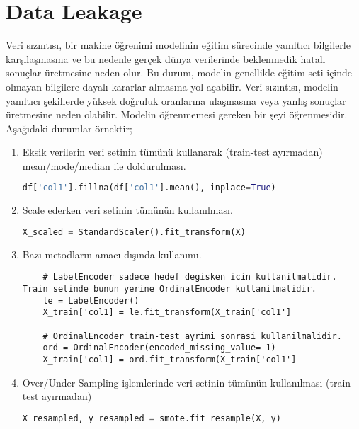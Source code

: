 \section{Data Leakage}
Veri sızıntısı, bir makine öğrenimi modelinin eğitim sürecinde yanıltıcı bilgilerle karşılaşmasına ve bu nedenle gerçek dünya verilerinde beklenmedik hatalı sonuçlar üretmesine neden olur. Bu durum, modelin genellikle eğitim seti içinde olmayan bilgilere dayalı kararlar almasına yol açabilir. Veri sızıntısı, modelin yanıltıcı şekillerde yüksek doğruluk oranlarına ulaşmasına veya yanlış sonuçlar üretmesine neden olabilir. Modelin öğrenmemesi gereken bir şeyi öğrenmesidir. Aşağıdaki durumlar örnektir;

\begin{enumerate}
    \item Eksik verilerin veri setinin tümünü kullanarak (train-test ayırmadan) mean/mode/median ile doldurulması.
    \begin{lstlisting}[language=Python]
    df['col1'].fillna(df['col1'].mean(), inplace=True)
    \end{lstlisting}
    \item Scale ederken veri setinin tümünün kullanılması.
    \begin{lstlisting}[language=Python]
    X_scaled = StandardScaler().fit_transform(X)
    \end{lstlisting}
    \item Bazı metodların amacı dışında kullanımı.
    \begin{lstlisting}
    # LabelEncoder sadece hedef degisken icin kullanilmalidir. Train setinde bunun yerine OrdinalEncoder kullanilmalidir.
    le = LabelEncoder()
    X_train['col1] = le.fit_transform(X_train['col1']

    # OrdinalEncoder train-test ayrimi sonrasi kullanilmalidir.
    ord = OrdinalEncoder(encoded_missing_value=-1)
    X_train['col1] = ord.fit_transform(X_train['col1']
    \end{lstlisting}
    \item Over/Under Sampling işlemlerinde veri setinin tümünün kullanılması (train-test ayırmadan)
    \begin{lstlisting}[language=Python]
    X_resampled, y_resampled = smote.fit_resample(X, y)
    \end{lstlisting}
\end{enumerate}

\newpage
